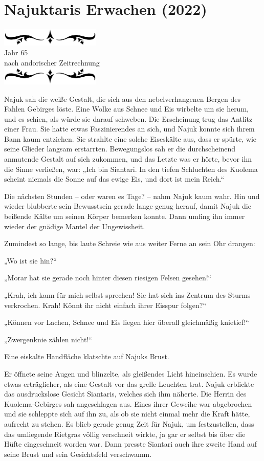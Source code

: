 \documentclass[10pt, a4paper, oneside]{book}
\newcommand{\az}[1]{%
    \begin{center}
        \includegraphics[width=180px]{Das Erbe des Wunderkindes/verzierung1.png}\\
        {\Huge #1} \\
        {nach andorischer Zeitrechnung}\\
        \includegraphics[width=180px]{Das Erbe des Wunderkindes/verzierung2.png}
    \end{center}
    \extramarks{}{#1 a.Z.}
}
\begin{document}
\newpage
\section{Najuktaris Erwachen (2022)}


\az{Jahr 65}

Najuk sah die weiße Gestalt, die sich aus den nebelverhangenen Bergen des Fahlen Gebirges löste. Eine Wolke aus Schnee und Eis wirbelte um sie herum, und es schien, als würde sie darauf schweben. Die Erscheinung trug das Antlitz einer Frau. Sie hatte etwas Faszinierendes an sich, und Najuk konnte sich ihrem Bann kaum entziehen. Sie strahlte eine solche Eiseskälte aus, dass er spürte, wie seine Glieder langsam erstarrten. Bewegungslos sah er die durchscheinend anmutende Gestalt auf sich zukommen, und das Letzte was er hörte, bevor ihn die Sinne verließen, war: „Ich bin Siantari. In den tiefen Schluchten des Kuolema scheint niemals die Sonne auf das ewige Eis, und dort ist mein Reich.“

Die nächsten Stunden – oder waren es Tage? – nahm Najuk kaum wahr. Hin und wieder blubberte sein Bewusstsein gerade lange genug herauf, damit Najuk die beißende Kälte um seinen Körper bemerken konnte. Dann umfing ihn immer wieder der gnädige Mantel der Ungewissheit.

Zumindest so lange, bis laute Schreie wie aus weiter Ferne an sein Ohr drangen:

„Wo ist sie hin?“

„Morar hat sie gerade noch hinter diesen riesigen Felsen gesehen!“

„Krah, ich kann für mich selbst sprechen! Sie hat sich ins Zentrum des Sturms verkrochen. Krah! Könnt ihr nicht einfach ihrer Eisspur folgen?“

„Können vor Lachen, Schnee und Eis liegen hier überall gleichmäßig knietief!“

„Zwergenknie zählen nicht!“

Eine eiskalte Handfläche klatschte auf Najuks Brust.

Er öffnete seine Augen und blinzelte, als gleißendes Licht hineinschien. Es wurde etwas erträglicher, als eine Gestalt vor das grelle Leuchten trat. Najuk erblickte das ausdruckslose Gesicht Siantaris, welches sich ihm näherte. Die Herrin des Kuolema-Gebirges sah angeschlagen aus. Eines ihrer Geweihe war abgebrochen und sie schleppte sich auf ihn zu, als ob sie nicht einmal mehr die Kraft hätte, aufrecht zu stehen. Es blieb gerade genug Zeit für Najuk, um festzustellen, dass das umliegende Rietgras völlig verschneit wirkte, ja gar er selbst bis über die Hüfte eingeschneit worden war. Dann presste Siantari auch ihre zweite Hand auf seine Brust und sein Gesichtsfeld verschwamm.
\end{document}
